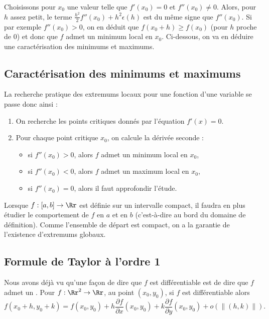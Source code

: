 Choisissons pour $x_0$ une valeur telle que $f'(x_0)=0$ et $f''(x_0)\neq 0$. 
Alors, pour $h$ assez petit, le terme $ \frac{h^2}{2} f''(x_0) + h^2 \epsilon (h)$ est du même signe que $f''(x_0)$. Si par exemple $f''(x_0)>0$, on en déduit que $f(x_0 + h) \ge f(x_0)$ (pour $h$ proche de $0$) et donc que $f$ admet un minimum local en $x_0$.
Ci-dessous, on va en déduire une caractérisation des minimums et maximums.

\subsection{Caractérisation des minimums et maximums}

La recherche pratique des extremums locaux pour une fonction d'une variable se passe donc ainsi :
\begin{enumerate}
	\item On recherche les points critiques donnés par l'équation $f'(x) = 0$.
	\item Pour chaque point critique $x_0$, on calcule la dérivée seconde :
	\begin{itemize}
		\item si $f''(x_0) > 0$, alors $f$ admet un minimum local en $x_0$,   
		\item si $f''(x_0) < 0$, alors $f$ admet un maximum local en $x_0$,
		\item si $f''(x_0) = 0$, alors  il faut approfondir l'étude.
	\end{itemize}    
\end{enumerate}

Lorsque $f : [a,b] \to \Rr$ est définie sur un intervalle compact, il faudra en plus étudier le comportement de $f$ en $a$ et en $b$ (c'est-à-dire au bord du domaine de définition). Comme l'ensemble de départ est compact, on a la garantie de l'existence d'extremums globaux.

\subsection{Formule de Taylor à l'ordre 1}

Nous avons déjà vu qu'une façon de dire que $f$ est différentiable est de dire que $f$ admet un . Pour $f : \Rr^2 \to \Rr$,
au point $(x_0,y_0)$, si $f$ est différentiable alors
$$f(x_0+h,y_0+k)=f(x_0,y_0)+h\frac{\partial f}{\partial x}(x_0,y_0)+k\frac{\partial f}{\partial y}(x_0,y_0)+o\left(\|(h,k)\|\right).$$

